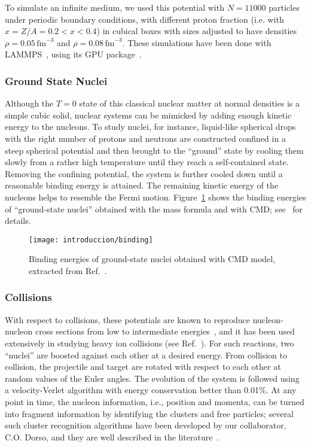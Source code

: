 To simulate an infinite medium, we used this potential with
$N = 11000$ particles under periodic boundary conditions, with
different proton fraction (i.e. with $x = Z/A = 0.2 < x < 0.4$) in
cubical boxes with sizes adjusted to have densities
$\rho=0.05 \,\text{fm}^{-3}$ and $\rho = 0.08\,\text{fm}^{-3}$. These
simulations have been done with LAMMPS~\cite{plimpton_fast_1995},
using its GPU package~\cite{brown_implementing_2012}.

\subsubsection{Ground State Nuclei}
Although the $T=0$ state of this classical nuclear matter at normal
densities is a simple cubic solid, nuclear systems can be mimicked by
adding enough kinetic energy to the nucleons. To study nuclei, for
instance, liquid-like spherical drops with the right number of protons
and neutrons are constructed confined in a steep spherical potential
and then brought to the ``ground'' state by cooling them slowly from a
rather high temperature until they reach a self-contained state.
Removing the confining potential, the system is further cooled down
until a reasonable binding energy is attained. The remaining kinetic
energy of the nucleons helps to resemble the Fermi motion.
Figure~\ref{fig:binding} shows the binding energies of ``ground-state
nuclei'' obtained with the mass formula and with CMD;
see~\cite{dorso_isoscaling_2011} for details.

\begin{figure}[h]
  \centering
  \texttt{[image: introduccion/binding]}
  \caption{Binding energies of ground-state nuclei obtained with CMD
    model, extracted from Ref.~\cite{dorso_isoscaling_2011}.}
  \label{fig:binding}
\end{figure}

\subsubsection{Collisions}
With respect to collisions, these potentials are known to reproduce
nucleon-nucleon cross sections from low to intermediate
energies~\cite{lenk_accuracy_1990}, and it has been used extensively
in studying heavy ion collisions (see
Ref.~\cite{chernomoretz_quasiclassical_2002, barranon_time_2007}). For
such reactions, two ``nuclei'' are boosted against each other at a
desired energy. From collision to collision, the projectile and target
are rotated with respect to each other at random values of the Euler
angles. The evolution of the system is followed using a
velocity-Verlet algorithm with energy conservation better than 0.01\%.
At any point in time, the nucleon information, i.e., position and
momenta, can be turned into fragment information by identifying the
clusters and free particles; several such cluster recognition
algorithms have been developed by our collaborator, C.O. Dorso, and
they are well described in the
literature~\cite{dorso_when_1995,strachan_time_1997}.


